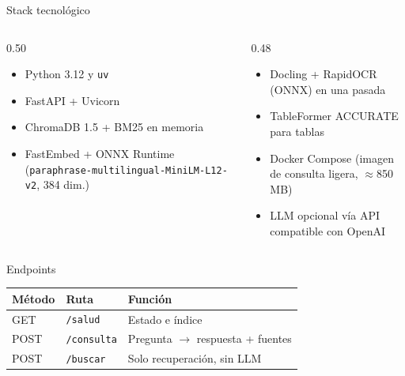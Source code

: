 \documentclass[aspectratio=169,11pt]{beamer}
\begin{document}
\begin{frame}{Stack tecnológico}
  \small
  \begin{columns}[T]
    \begin{column}{0.50\textwidth}
      \begin{itemize}
        \item Python 3.12 y \texttt{uv}
        \item FastAPI + Uvicorn
        \item ChromaDB 1.5 + BM25 en memoria
        \item FastEmbed + ONNX Runtime
              (\texttt{paraphrase-\allowbreak multilingual-\allowbreak MiniLM-L12-v2}, 384 dim.)
      \end{itemize}
    \end{column}
    \begin{column}{0.48\textwidth}
      \begin{itemize}
        \item Docling + RapidOCR (ONNX) en una pasada
        \item TableFormer ACCURATE para tablas
        \item Docker Compose (imagen de consulta ligera, $\approx$850 MB)
        \item LLM opcional vía API compatible con OpenAI
      \end{itemize}
    \end{column}
  \end{columns}

  \vspace{2mm}
  \begin{block}{Endpoints}
    \centering
    \setlength{\tabcolsep}{4pt}
    \begin{tabular}{@{}lll@{}}
      \toprule
      Método & Ruta & Función \\
      \midrule
      GET  & \texttt{/salud}    & Estado e índice \\
      POST & \texttt{/consulta} & Pregunta $\rightarrow$ respuesta + fuentes \\
      POST & \texttt{/buscar}   & Solo recuperación, sin LLM \\
      \bottomrule
    \end{tabular}
  \end{block}
\end{frame}
\end{document}
